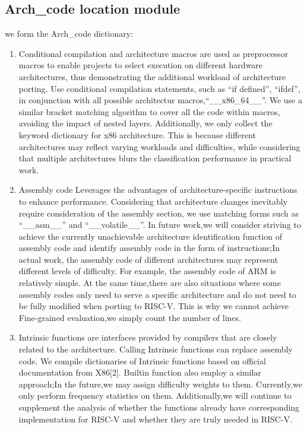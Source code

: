 \documentclass[sigconf,screen,review]{acmart}
\begin{document}
\subsection{Arch\_code location module}
we form the Arch\_code dictionary:
\begin{enumerate}
  \item Conditional compilation and architecture macros are used as preprocessor macros to enable projects to select execution on different hardware architectures, thus demonstrating the additional workload of architecture porting.
  Use conditional compilation statements, such as ``if defined'', ``ifdef'', in conjunction with all possible architectur macros,``\_\_x86\_64\_\_''.
  We use a similar bracket matching algorithm to cover all the code within macros, avoiding the impact of nested layers.
  Additionally, we only collect the keyword dictionary for x86 architecture.
  This is because different architectures may reflect varying workloads and difficulties, while considering that multiple architectures blurs the classification performance in practical work.
  \item Assembly code Leverages the advantages of architecture-specific instructions to enhance performance.
  Considering that architecture changes inevitably require consideration of the assembly section, we use matching forms such as ``\_\_asm\_\_'' and ``\_\_volatile\_\_''.
  In future work,we will consider striving to achieve the currently unachievable architecture identification function of assembly code and identify assembly code in the form of instructions;In actual work, the assembly code of different architectures may represent different levels of difficulty.
  For example, the assembly code of ARM is relatively simple.
  At the same time,there are also situations where some assembly codes only need to serve a specific architecture and do not need to be fully modified when porting to RISC-V.
  This is why we cannot achieve Fine-grained evaluation,we simply count the number of lines.
  \item Intrinsic functions are interfaces provided by compilers that are closely related to the architecture.
  Calling Intrinsic functions can replace assembly code.
  We compile dictionaries of Intrinsic functions based on official documentation from X86[2].
  Builtin function also employ a similar approach;In the future,we may assign difficulty weights to them.
  Currently,we only perform frequency statistics on them.
  Additionally,we will continue to supplement the analysis of whether the functions already have corresponding implementation for RISC-V and whether they are truly needed in RISC-V.

\end{enumerate}
\end{document}
